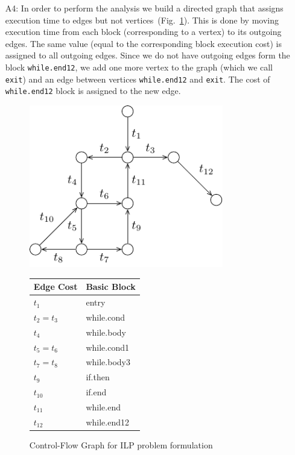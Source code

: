 \documentclass[12pt,a4paper,titlepage,oneside]{article}
\begin{document}
\begin{itemize}
\item[A4:] 
In order to perform the analysis we build a directed graph that assigns execution time to edges but not vertices~(Fig.~\ref{fig:ilp}).
This is done by moving execution time from each block (corresponding to a vertex) to its outgoing edges.
The same value (equal to the corresponding block execution cost) is assigned to all outgoing edges.
Since we do not have outgoing edges form the block \texttt{while.end12}, we add one more vertex to the graph (which we call \texttt{exit}) and an edge between vertices \texttt{while.end12} and \texttt{exit}.
The cost of \texttt{while.end12} block is assigned to the new edge.
\begin{figure}
  \centering
  \begin{minipage}[c]{.6\linewidth}
    \centering
    \includegraphics[width=0.8\textwidth]{graph}
  \end{minipage}%
  \begin{minipage}[c]{.3\linewidth}
    \centering
    \small
	\begin{tabular}{l|l}
		\hline
		Edge Cost & Basic Block \\
		\hline
		$t_1$ & entry \\
		$t_2 = t_3$ & while.cond \\
		$t_4$ & while.body \\
		$t_5 = t_6$ & while.cond1 \\
		$t_7 = t_8$ & while.body3 \\
		$t_9$ & if.then \\
		$t_{10}$ & if.end \\
		$t_{11}$ & while.end \\
		$t_{12}$ & while.end12 \\
		\hline
	\end{tabular}
  \end{minipage}
  \caption{Control-Flow Graph for ILP problem formulation}
  \label{fig:ilp}
\end{figure}


\end{itemize}
\end{document}
